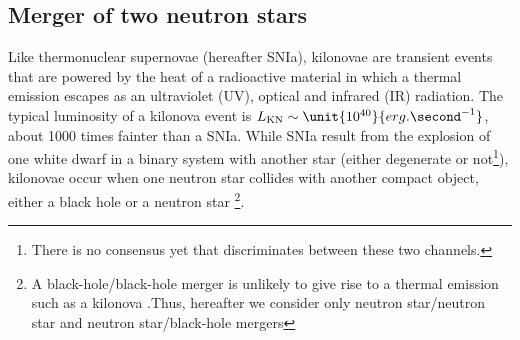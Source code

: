 \documentclass[a4paper, twoside, 11pt]{article}
\numberwithin{equation}{section}
\begin{document}
\subsection{Merger of two neutron stars}
\label{subsec:merger}
\hspace{\parindent}	Like thermonuclear supernovae (hereafter SNIa), kilonovae are transient events that are powered by the heat of a radioactive material in which a thermal emission escapes as an ultraviolet (UV), optical and infrared (IR) radiation. The typical luminosity of a kilonova event is $L_{\rm{KN}} \sim \unit{10^{40}}{erg.\second^{-1}}$, about 1000 times fainter than a SNIa.
 While SNIa result from the explosion of one white dwarf {in a binary system} with another star (either {degenerate} or not\footnote{There is no consensus yet that  discriminates between these two channels.}),  kilonovae occur when one neutron star collides with another compact object, either a black hole or a neutron star \footnote{A black-hole/black-hole merger is unlikely to give rise to a thermal emission such as a kilonova \cite{KN}.Thus, hereafter we consider only  neutron star/neutron star  and neutron star/black-hole mergers}. \\
 
\end{document}

